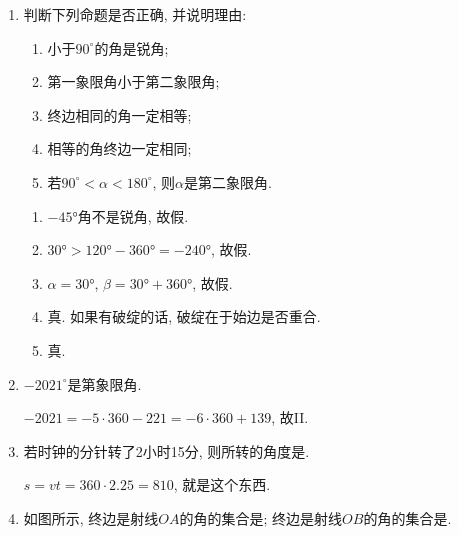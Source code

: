 \begin{enumerate}
\item 判断下列命题是否正确, 并说明理由: 
\begin{enumerate}
\item 小于$90^{\circ}$的角是锐角; 
\item 第一象限角小于第二象限角; 
\item 终边相同的角一定相等; 
\item 相等的角终边一定相同; 
\item 若$90^{\circ}<\alpha<180^{\circ}$, 则$\alpha$是第二象限角. 
\end{enumerate}
\begin{jieda}
\begin{enumerate}[(1)]
\item $-\ang{45}$角不是锐角, 故假. 
\item $\ang{30}>\ang{120}-\ang{360}=-\ang{240}$, 故假. 
\item $\alpha=\ang{30}$, $\beta=\ang{30}+\ang{360}$, 故假. 
\item 真. 如果有破绽的话, 破绽在于始边是否重合. 
\item 真. 
\end{enumerate}
\end{jieda}

\item $-2021^{\circ}$是第象限角. 
\begin{jieda}
$-2021=-5\cdot360-221=-6\cdot 360+139$, 故II. 
\end{jieda}


\item 若时钟的分针转了2小时15分, 则所转的角度是. 
\begin{jieda}
$s=vt=360\cdot 2.25=810$, 就是这个东西. 
\end{jieda}


\item 如图所示, 终边是射线$OA$的角的集合是; 
终边是射线$OB$的角的集合是. 



\end{enumerate}
